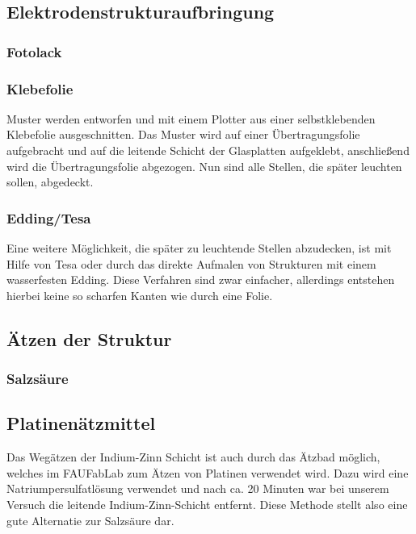 \subsection{Elektrodenstrukturaufbringung}
\subsubsection*{Fotolack}
\subsubsection*{Klebefolie}\label{subsec:klebefolie}
Muster werden entworfen und mit einem Plotter aus einer selbstklebenden Klebefolie ausgeschnitten. Das Muster wird auf einer Übertragungsfolie aufgebracht und auf die leitende Schicht der Glasplatten aufgeklebt, anschließend wird die Übertragungsfolie abgezogen. Nun sind alle Stellen, die später leuchten sollen, abgedeckt.
\subsubsection*{Edding/Tesa}
Eine weitere Möglichkeit, die später zu leuchtende Stellen abzudecken, ist mit Hilfe von Tesa oder durch das direkte Aufmalen von Strukturen mit einem wasserfesten Edding. Diese Verfahren sind zwar einfacher, allerdings entstehen hierbei keine so scharfen Kanten wie durch eine Folie.
\subsection{Ätzen der Struktur}
\subsubsection*{Salzsäure}
\subsection*{Platinenätzmittel}
Das Wegätzen der Indium-Zinn Schicht ist auch durch das Ätzbad möglich, welches im FAUFabLab zum Ätzen von Platinen verwendet wird. Dazu wird eine Natriumpersulfatlösung verwendet und nach ca. 20 Minuten war bei unserem Versuch die leitende Indium-Zinn-Schicht entfernt. Diese Methode stellt also eine gute Alternatie zur Salzsäure dar.

